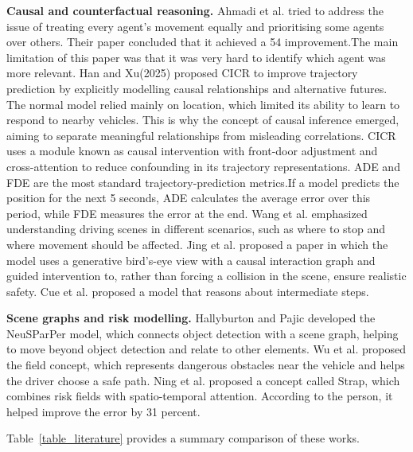 \documentclass[preprint,12pt]{elsarticle}
\begin{document}
\textbf{Causal and counterfactual reasoning.} Ahmadi et al. \cite{ahmadi2025critic} tried to address the issue of treating every agent's movement equally and prioritising some agents over others. Their paper concluded that it achieved a 54 improvement.The main limitation of this paper was that it was very hard to identify which agent was more relevant. Han and Xu(2025) \cite{han2025cicr} proposed CICR to improve trajectory prediction by explicitly modelling causal relationships and alternative futures. The normal model relied mainly on location, which limited its ability to learn to respond to nearby vehicles. This is why the concept of causal inference emerged, aiming to separate meaningful relationships from misleading correlations. CICR uses a module known as causal intervention with front-door adjustment and cross-attention to reduce confounding in its trajectory representations. ADE and FDE are the most standard trajectory-prediction metrics.If a model predicts the position for the next 5 seconds, ADE calculates the average error over this period, while FDE measures the error at the end. Wang et al. \cite{wang2025beyond} emphasized understanding driving scenes in different scenarios, such as where to stop and where movement should be affected. Jing et al. \cite{jing2026counterscene} proposed a paper in which the model uses a generative bird's-eye view with a causal interaction graph and guided intervention to, rather than forcing a collision in the scene, ensure realistic safety. Cue et al. \cite{cui2025cot}  proposed a model that reasons about intermediate steps.

\textbf{Scene graphs and risk modelling.} Hallyburton and Pajic \cite{hallyburton2025neuspaper} developed the NeuSParPer model, which connects object detection with a scene graph, helping to move beyond object detection and relate to other elements. Wu et al. \cite{wu2024riskfield} proposed the field concept, which represents dangerous obstacles near the vehicle and helps the driver choose a safe path. Ning et al.  \cite{ning2025strap} proposed a concept called Strap, which combines risk fields with spatio-temporal attention. According to the person, it helped improve the error by 31 percent.

Table~\ref{table_literature} provides a summary comparison of these works.
\end{document}
